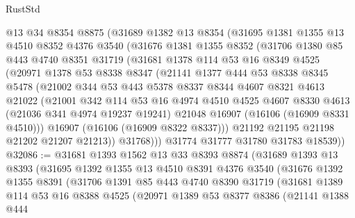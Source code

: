 \begin{lexlean}{RustStd}
\begin{coremodule}
    @13
    @34
    @8354
    @8875
    (@31689
      @1382
      @13
      @8354
      (@31695
        @1381
        @1355
        @13
        @4510
        @8352
        @4376
        @3540
        (@31676
          @1381
          @1355
          @8352
          (@31706
            @1380
            @85
            @443
            @4740
            @8351
            @31719
            (@31681
              @1378
              @114
              @53
              @16
              @8349
              @4525
              (@20971
                @1378
                @53
                @8338
                @8347
                (@21141
                  @1377
                  @444
                  @53
                  @8338
                  @8345
                  @5478
                  (@21002
                    @344
                    @53
                    @443
                    @5378
                    @8337
                    @8344
                    @4607
                    @8321
                    @4613
                    @21022
                    (@21001
                      @342
                      @114
                      @53
                      @16
                      @4974
                      @4510
                      @4525
                      @4607
                      @8330
                      @4613
                      (@21036 @341 @4974 @19237 @19241)
                      @21048
                      @16907
                      (@16106 (@16909 @8331 @4510)))
                    @16907
                    (@16106 (@16909 @8322 @8337)))
                  @21192
                  @21195
                  @21198
                  @21202
                  @21207
                  @21213))
              @31768)))
        @31774
        @31777
        @31780
        @31783
        @18539))
@32086 := @31681
    @1393
    @1562
    @13
    @33
    @8393
    @8874
    (@31689
      @1393
      @13
      @8393
      (@31695
        @1392
        @1355
        @13
        @4510
        @8391
        @4376
        @3540
        (@31676
          @1392
          @1355
          @8391
          (@31706
            @1391
            @85
            @443
            @4740
            @8390
            @31719
            (@31681
              @1389
              @114
              @53
              @16
              @8388
              @4525
              (@20971
                @1389
                @53
                @8377
                @8386
                (@21141
                  @1388
                  @444

\end{coremodule}
\end{lexlean}
